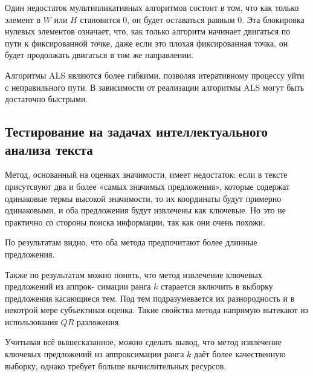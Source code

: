 Один недостаток мультипликативных алгоритмов состоит в том, что как только элемент в $W$ или $H$ становится 0,
он будет оставаться равным 0. Эта блокировка нулевых элементов означает, что,
как только алгоритм начинает двигаться по пути к фиксированной точке,
даже если это плохая фиксированная точка, он будет продолжать двигаться в том же направлении.

Алгоритмы ALS являются более гибкими, позволяя итеративному процессу уйти с неправильного пути.
В зависимости от реализации алгоритмы ALS могут быть достаточно быстрыми.



\newpage



\subsection{Тестирование на задачах интеллектуального анализа текста}

Метод, основанный на оценках значимости, имеет недостаток:
если в тексте присутсвуют два и более «самых значимых предложения», которые содержат одинаковые термы высокой значимости,
то их координаты будут примерно одинаковыми, и оба предложения будут извлечены как ключевые.
Но это не практично со стороны поиска информации, так как они очень похожи.

По результатам видно, что оба метода предпочитают более длинные предложения.

Также по результатам можно понять, что метод извлечение ключевых предложений из аппрок-
симации ранга $k$ старается включить в выборку предложения касающиеся  тем.
Под  тем подразумевается их разнородность и в некотрой мере субъектиная оценка.
Такие свойства метода напрямую вытекают из использования $QR$ разложения.

Учитывая всё вышесказанное, можно сделать вывод, что метод извлечение ключевых предложений из
аппроксимации ранга $k$ даёт более качественную выборку, однако требует больше вычислительных ресурсов.
